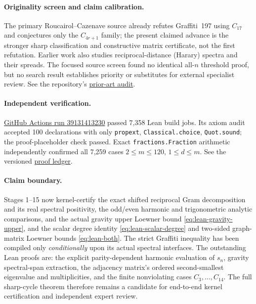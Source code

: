 \paragraph{Originality screen and claim calibration.}
The primary Roucairol--Cazenave source already refutes Graffiti~197
using $C_{17}$ and conjectures only the $C_{4r+1}$ family;
the present claimed advance is the stronger sharp classification
and constructive matrix certificate, not the first refutation.
Earlier work also studies reciprocal-distance (Harary) spectra
and their spreads. The focused source screen found no identical
all-$n$ threshold proof, but no search result establishes priority
or substitutes for external specialist review.
See the repository's
\href{https://github.com/tonynewton79-web/newton-400-conjectures/blob/main/cases/001/PRIOR_ART_AUDIT.md}{prior-art audit}.

\paragraph{Independent verification.}
\href{https://github.com/tonynewton79-web/newton-400-conjectures/actions/runs/39131413230}{GitHub Actions run 39131413230} passed 7,358 Lean build jobs.
Its axiom audit accepted 100 declarations with only
\texttt{propext}, \texttt{Classical.choice}, \texttt{Quot.sound};
the proof-placeholder check passed. Exact
\texttt{fractions.Fraction} arithmetic independently confirmed
all 7,259 cases $2\le m\le120$, $1\le d\le m$.
See the versioned \href{https://github.com/tonynewton79-web/newton-400-conjectures/blob/main/cases/001/LEAN_STATUS.md}{proof ledger}.

\paragraph{Claim boundary.}
Stages 1--15 now kernel-certify the exact shifted reciprocal
Gram decomposition and its real spectral positivity, the
odd/even harmonic and trigonometric analytic comparisons,
and the actual gravity upper Loewner bound
\eqref{eq:lean-gravity-upper}, and the scalar degree identity
\eqref{eq:lean-scalar-degree} and two-sided graph-matrix
Loewner bounds \eqref{eq:lean-both}. The strict Graffiti
inequality has been compiled only \emph{conditionally}
upon its actual spectral interfaces. The outstanding Lean
proofs are: the explicit parity-dependent harmonic evaluation of $s_n$,
gravity spectral-span extraction, the adjacency matrix's
ordered second-smallest eigenvalue and multiplicities, and
the finite nonviolating cases $C_3,\ldots,C_{14}$.
The full sharp-cycle theorem therefore remains a candidate
for end-to-end kernel certification and independent expert review.
